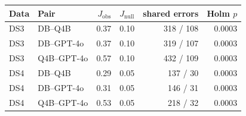 \begin{tabular}{@{}llrrrr@{}}
\toprule
Data & Pair & $J_{\mathrm{obs}}$ & $J_{\mathrm{null}}$ & shared errors & Holm $p$ \\
\midrule
DS3 & DB--Q4B & 0.37 & 0.10 & 318 / 108 & 0.0003 \\
DS3 & DB--GPT-4o & 0.37 & 0.10 & 319 / 107 & 0.0003 \\
DS3 & Q4B--GPT-4o & 0.57 & 0.10 & 432 / 109 & 0.0003 \\
DS4 & DB--Q4B & 0.29 & 0.05 & 137 / 30 & 0.0003 \\
DS4 & DB--GPT-4o & 0.31 & 0.05 & 146 / 31 & 0.0003 \\
DS4 & Q4B--GPT-4o & 0.53 & 0.05 & 218 / 32 & 0.0003 \\
\bottomrule
\end{tabular}
